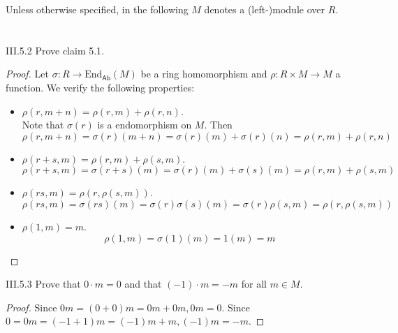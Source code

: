 Unless otherwise specified, in the following $M$ denotes a (left-)module over $R$.

\section{}

\begin{problem}{III.5.2}
Prove claim 5.1.
\end{problem}
\begin{proof}
Let $\sigma : R \to \text{End}_\mathsf{Ab}(M)$ be a ring homomorphism and $\rho : R \times M \to M$ a function. We verify the following properties:
\begin{itemize}
\setlength\itemsep{0pt}
\item $\rho(r,m+n) = \rho(r,m) + \rho(r,n)$. \\
Note that $\sigma(r)$ is a endomorphism on $M$. Then 
\[
\rho(r,m+n) = \sigma(r)(m+n) = \sigma(r)(m) + \sigma(r)(n) = \rho(r,m) + \rho(r,n)	
\] 
\item $\rho(r+s, m) = \rho(r,m) + \rho(s,m)$. 
\[
\rho(r+s, m) = \sigma(r+s)(m) = \sigma(r)(m) + \sigma(s)(m) = \rho(r,m) + \rho(s,m)
\]
\item $\rho(rs,m) = \rho(r,\rho(s,m))$. 
\[
\rho(rs,m) = \sigma(rs)(m) = \sigma(r)\sigma(s)(m) = \sigma(r)\rho(s,m) = \rho(r,\rho(s,m))
\]
\item $\rho(1,m) = m$. 
\[
\rho(1,m) = \sigma(1)(m) = 1(m) = m	
\]
\end{itemize}
\end{proof}

\begin{problem}{III.5.3}
Prove that $0\cdot m = 0$ and that $(-1) \cdot m = -m$ for all $m \in M$. 
\end{problem}
\begin{proof}
Since $0m = (0+0)m = 0m + 0m, 0m = 0$. Since $0 = 0m = (-1+1)m = (-1)m+m, (-1)m = -m$.
\end{proof}

